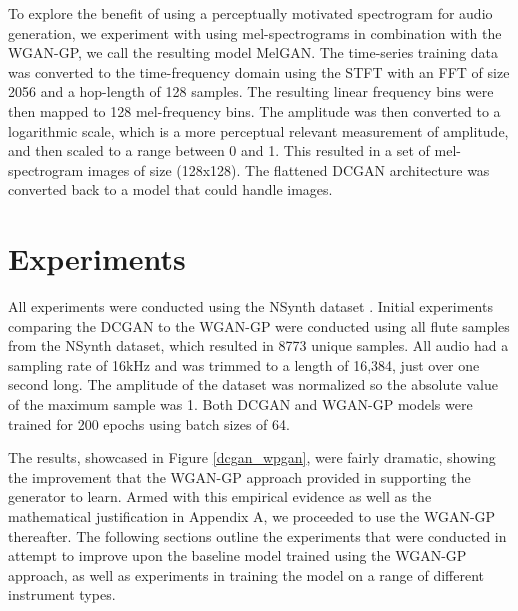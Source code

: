 
To explore the benefit of using a perceptually motivated spectrogram for audio generation, we experiment with using mel-spectrograms in combination with the WGAN-GP, we call the resulting model MelGAN. The time-series training data was converted to the time-frequency domain using the STFT with an FFT of size 2056 and a hop-length of 128 samples. The resulting linear frequency bins were then mapped to 128 mel-frequency bins. The amplitude was then converted to a logarithmic scale, which is a more perceptual relevant measurement of amplitude, and then scaled to a range between 0 and 1. This resulted in a set of mel-spectrogram images of size (128x128). The flattened DCGAN architecture was converted back to a model that could handle images. %


\section{Experiments}
All experiments were conducted using the NSynth dataset \cite{nsynth2017}. Initial experiments comparing the DCGAN to the WGAN-GP were conducted using all flute samples from the NSynth dataset, which resulted in 8773 unique samples. All audio had a sampling rate of 16kHz and was trimmed to a length of 16,384, just over one second long. The amplitude of the dataset was normalized so the absolute value of the maximum sample was 1. Both DCGAN and WGAN-GP models were trained for 200 epochs using batch sizes of 64.

The results, showcased in Figure \ref{dcgan_wpgan}, were fairly dramatic, showing the improvement that the WGAN-GP approach provided in supporting the generator to learn. Armed with this empirical evidence as well as the mathematical justification in Appendix A, we proceeded to use the WGAN-GP thereafter. The following sections outline the experiments that were conducted in attempt to improve upon the baseline model trained using the WGAN-GP approach, as well as experiments in training the model on a range of different instrument types.

